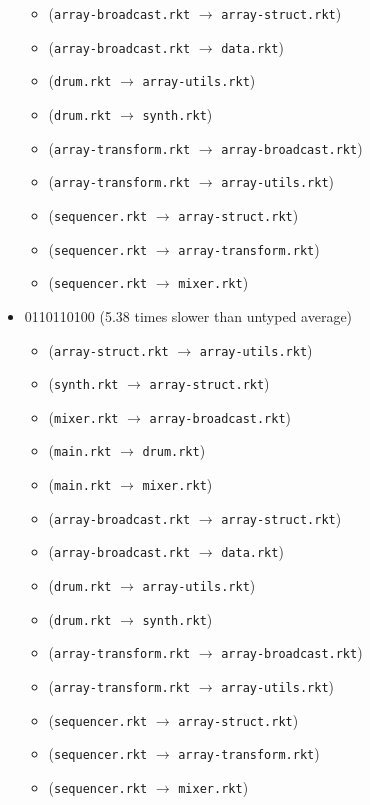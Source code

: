 \documentclass{article}
\newcommand{\mono}[1]{\texttt{#1}}
\begin{document}
\begin{itemize}
\begin{itemize}
  \item (\mono{array-broadcast.rkt} $\rightarrow$ \mono{array-struct.rkt})
  \item (\mono{array-broadcast.rkt} $\rightarrow$ \mono{data.rkt})
  \item (\mono{drum.rkt} $\rightarrow$ \mono{array-utils.rkt})
  \item (\mono{drum.rkt} $\rightarrow$ \mono{synth.rkt})
  \item (\mono{array-transform.rkt} $\rightarrow$ \mono{array-broadcast.rkt})
  \item (\mono{array-transform.rkt} $\rightarrow$ \mono{array-utils.rkt})
  \item (\mono{sequencer.rkt} $\rightarrow$ \mono{array-struct.rkt})
  \item (\mono{sequencer.rkt} $\rightarrow$ \mono{array-transform.rkt})
  \item (\mono{sequencer.rkt} $\rightarrow$ \mono{mixer.rkt})
  \end{itemize}
\item 0110110100 (5.38 times slower than untyped average)
  \begin{itemize}
  \item (\mono{array-struct.rkt} $\rightarrow$ \mono{array-utils.rkt})
  \item (\mono{synth.rkt} $\rightarrow$ \mono{array-struct.rkt})
  \item (\mono{mixer.rkt} $\rightarrow$ \mono{array-broadcast.rkt})
  \item (\mono{main.rkt} $\rightarrow$ \mono{drum.rkt})
  \item (\mono{main.rkt} $\rightarrow$ \mono{mixer.rkt})
  \item (\mono{array-broadcast.rkt} $\rightarrow$ \mono{array-struct.rkt})
  \item (\mono{array-broadcast.rkt} $\rightarrow$ \mono{data.rkt})
  \item (\mono{drum.rkt} $\rightarrow$ \mono{array-utils.rkt})
  \item (\mono{drum.rkt} $\rightarrow$ \mono{synth.rkt})
  \item (\mono{array-transform.rkt} $\rightarrow$ \mono{array-broadcast.rkt})
  \item (\mono{array-transform.rkt} $\rightarrow$ \mono{array-utils.rkt})
  \item (\mono{sequencer.rkt} $\rightarrow$ \mono{array-struct.rkt})
  \item (\mono{sequencer.rkt} $\rightarrow$ \mono{array-transform.rkt})
  \item (\mono{sequencer.rkt} $\rightarrow$ \mono{mixer.rkt})

\end{itemize}
\end{itemize}
\end{document}
